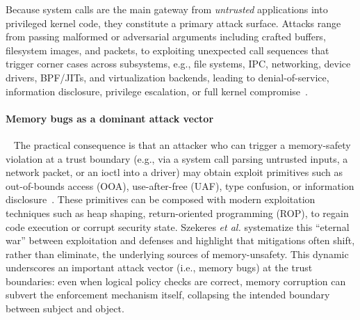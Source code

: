 Because system calls are the main gateway from \textit{untrusted} applications into privileged kernel code, they constitute a primary attack surface. 
Attacks range from passing malformed or adversarial arguments including crafted buffers, filesystem images, and packets, to exploiting unexpected call sequences that trigger corner cases across subsystems, e.g., file systems, IPC, networking, device drivers, BPF/JITs, and virtualization backends, leading to denial-of-service, information disclosure, privilege escalation, or full kernel compromise~\cite{chen2011linux}.


\paragraph{\textbf{Memory bugs as a dominant attack vector}}
~
The practical consequence is that an attacker who can trigger a memory-safety violation at a trust boundary (e.g., via a system call parsing untrusted inputs, a network packet, or an ioctl into a driver) may obtain exploit primitives such as out-of-bounds access (OOA), use-after-free (UAF), type confusion, or information disclosure~\cite{chen2020koobe, xu2015collision, wu2025flow}. 
These primitives can be composed with modern exploitation techniques such as heap shaping, return-oriented programming (ROP), to regain code execution or corrupt security state. Szekeres \emph{et al.} systematize this ``eternal war'' between exploitation and defenses and highlight that mitigations often shift, rather than eliminate, the underlying sources of memory-unsafety\cite{szekeres13}. 
This dynamic underscores an important attack vector (i.e., memory bugs) at the trust boundaries: even when logical policy checks are correct, memory corruption can subvert the enforcement mechanism itself, collapsing the intended boundary between subject and object.

